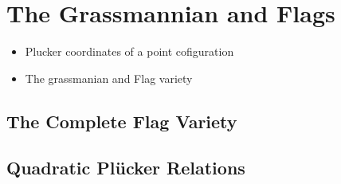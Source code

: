 \section{The Grassmannian and Flags}

\begin{itemize}
    \item Plucker coordinates of a point cofiguration
    \item The grassmanian and Flag variety
\end{itemize}

\subsection{The Complete Flag Variety}

\subsection{Quadratic Pl\"ucker Relations}
